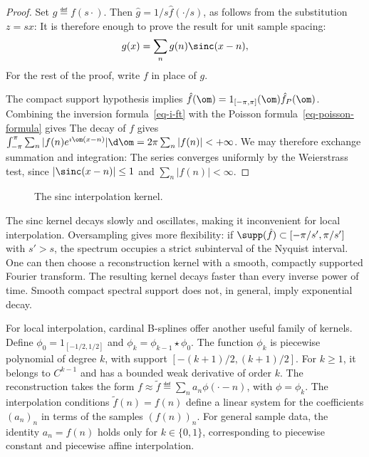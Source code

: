\begin{proof} 
	Set $g \eqdef f(s \cdot)$. Then $\hat g=1/s \hat f(\cdot/s)$, as follows from the substitution $z=s x$:
	It is therefore enough to prove the result for unit sample spacing:
	$$
		g(x) = \sum_n g(n) \sinc(x-n), 
	$$
	For the rest of the proof, write $f$ in place of $g$.
	 
	The compact support hypothesis implies $\hat f(\om) = 1_{[-\pi,\pi]}(\om) \hat f_P(\om)$.  
	Combining the inversion formula~\eqref{eq-i-ft} with the Poisson formula~\eqref{eq-poisson-formula} gives
	The decay of $f$ gives $\int_{-\pi}^\pi \sum_n |f(n) e^{\imath \om (x-n)}| \d \om = 2\pi\sum_n |f(n)| < +\infty$. We may therefore exchange summation and integration:
The series converges uniformly by the Weierstrass test, since $|\sinc(x-n)|\leq 1$ and $\sum_n|f(n)|<\infty$.
\end{proof}

\begin{figure}[tbp]
\centering
{}
\caption{The sinc interpolation kernel.}
\label{fig-review-shannon-sinc}
\end{figure}
The sinc kernel decays slowly and oscillates, making it inconvenient for local interpolation. Oversampling gives more flexibility: if $\supp(\hat f)\subset[-\pi/s',\pi/s']$ with $s'>s$, the spectrum occupies a strict subinterval of the Nyquist interval. One can then choose a reconstruction kernel with a smooth, compactly supported Fourier transform. The resulting kernel decays faster than every inverse power of time. Smooth compact spectral support does not, in general, imply exponential decay.

 
For local interpolation, cardinal B-splines offer another useful family of kernels. Define $\phi_0=1_{[-1/2,1/2]}$ and $\phi_k = \phi_{k-1} \star \phi_0$. The function $\phi_k$ is piecewise polynomial of degree $k$, with support $[-(k+1)/2,(k+1)/2]$. For $k\geq1$, it belongs to $C^{k-1}$ and has a bounded weak derivative of order $k$.
The reconstruction takes the form $f \approx \tilde f \eqdef \sum_n a_n \phi(\cdot-n)$, with $\phi=\phi_k$. The interpolation conditions $\tilde f(n)=f(n)$ define a linear system for the coefficients $(a_n)_n$ in terms of the samples $(f(n))_n$. For general sample data, the identity $a_n=f(n)$ holds only for $k \in \{0,1\}$, corresponding to piecewise constant and piecewise affine interpolation.
 
